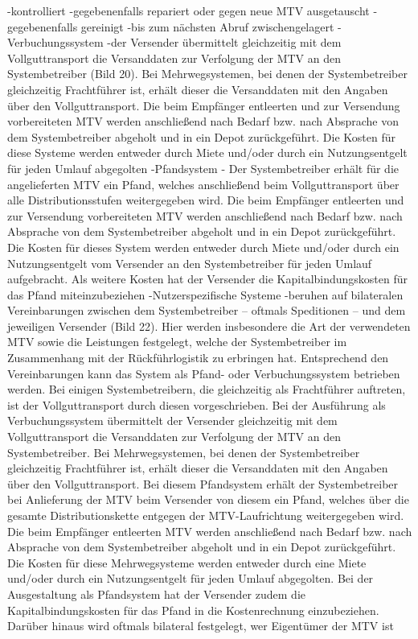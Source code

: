                             -kontrolliert
                            -gegebenenfalls repariert oder gegen neue MTV ausgetauscht
                            -gegebenenfalls gereinigt
                            -bis zum nächsten Abruf zwischengelagert
                    -Verbuchungssystem
                        -der Versender übermittelt gleichzeitig mit dem Vollguttransport die Versanddaten zur Verfolgung der MTV an den Systembetreiber (Bild 20). Bei Mehrwegsystemen, bei denen der Systembetreiber gleichzeitig Frachtführer ist, erhält dieser die Versanddaten mit den Angaben über den Vollguttransport. Die beim Empfänger entleerten und zur Versendung vorbereiteten MTV werden anschließend nach Bedarf bzw. nach Absprache von dem Systembetreiber abgeholt und in ein Depot zurückgeführt. Die Kosten für diese Systeme werden entweder durch Miete und/oder durch ein Nutzungsentgelt für jeden Umlauf abgegolten
                    -Pfandsystem
                        - Der Systembetreiber erhält für die angelieferten MTV ein Pfand, welches anschließend beim Vollguttransport über alle Distributionsstufen weitergegeben wird. Die beim Empfänger entleerten und zur Versendung vorbereiteten MTV werden anschließend nach Bedarf bzw. nach Absprache von dem Systembetreiber abgeholt und in ein Depot zurückgeführt. Die Kosten für dieses System werden entweder durch Miete und/oder durch ein Nutzungsentgelt vom Versender an den Systembetreiber für jeden Umlauf aufgebracht. Als weitere Kosten hat der Versender die Kapitalbindungskosten für das Pfand miteinzubeziehen 
                    -Nutzerspezifische Systeme
                        -beruhen auf bilateralen Vereinbarungen zwischen dem Systembetreiber – oftmals Speditionen – und dem jeweiligen Versender (Bild 22). Hier werden insbesondere die Art der verwendeten MTV sowie die Leistungen festgelegt, welche der Systembetreiber im Zusammenhang mit der Rückführlogistik zu erbringen hat. Entsprechend den Vereinbarungen kann das System als Pfand- oder Verbuchungssystem betrieben werden. Bei einigen Systembetreibern, die gleichzeitig als Frachtführer auftreten, ist der Vollguttransport durch diesen vorgeschrieben. Bei der Ausführung als Verbuchungssystem übermittelt der Versender gleichzeitig mit dem Vollguttransport die Versanddaten zur Verfolgung der MTV an den Systembetreiber. Bei Mehrwegsystemen, bei denen der Systembetreiber gleichzeitig Frachtführer ist, erhält dieser die Versanddaten mit den Angaben über den Vollguttransport. Bei diesem Pfandsystem erhält der Systembetreiber bei Anlieferung der MTV beim Versender von diesem ein Pfand, welches über die gesamte Distributionskette entgegen der MTV-Laufrichtung weitergegeben wird. Die beim Empfänger entleerten MTV werden anschließend nach Bedarf bzw. nach Absprache von dem Systembetreiber abgeholt und in ein Depot zurückgeführt. Die Kosten für diese Mehrwegsysteme werden entweder durch eine Miete und/oder durch ein Nutzungsentgelt für jeden Umlauf abgegolten. Bei der Ausgestaltung als Pfandsystem hat der Versender zudem die Kapitalbindungskosten für das Pfand in die Kostenrechnung einzubeziehen. Darüber hinaus wird oftmals bilateral festgelegt, wer Eigentümer der MTV ist
        
